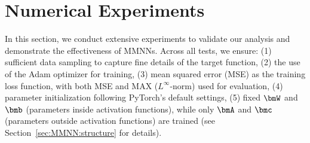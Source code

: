 \documentclass[11pt,a4paper]{article}
\begin{document}







\section{Numerical Experiments}
\label{sec:experiments}

In this section, we conduct extensive experiments to validate our analysis and demonstrate the effectiveness of MMNNs. Across all tests, we ensure: (1) sufficient data sampling to capture fine details of the target function, (2) the use of the Adam optimizer \cite{DBLP:journals/corr/KingmaB14} for training, (3) mean squared error (MSE) as the training loss function, with both MSE and MAX ($L^\infty$-norm) used for evaluation, (4) parameter initialization following PyTorch's default settings,
(5) fixed $\bmW$ and $\bmb$ (parameters inside activation functions), while only $\bmA$ and $\bmc$ (parameters outside activation functions) are trained (see Section~\ref{sec:MMNN:structure} for details).
\end{document}
